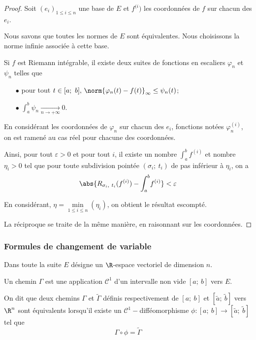 \begin{proof}
Soit $\left(e_i\right)_{1 \leq i \leq n}$ une base de $E$ et $f^{(i})$ les coordonnées de $f$ sur chacun des $e_i$.

Nous savons que toutes les normes de $E$ sont équivalentes. Nous choisissons la norme infinie associée à cette base.

Si $f$ est Riemann intégrable, il existe deux suites de fonctions en escaliers $\varphi_n$ et $\psi_n$ telles que
\begin{itemize}
\item[$\bullet$] pour tout $t \in [a;~b], \, \norm{\varphi_n(t)-f(t)}_{\infty} \leq \psi_n(t)$;
\item[$\bullet$] $\displaystyle{\int_a^b} \psi_n \underset{n \to +\infty}{\longrightarrow} 0$.
\end{itemize}


En considérant les coordonnées de $\varphi_n$ sur chacun des $e_i$, fonctions notées $\varphi_n^{(i)}$, on est ramené au cas réel pour chacune des coordonnées. 

Ainsi, pour tout $\varepsilon>0$ et pour tout $i$, il existe un nombre $\displaystyle{\int_a^b} f^{(i)}$ et nombre $\eta_i>0$ tel que pour toute subdivision pointée $(\sigma_i;~t_i)$ de pas inférieur à $\eta_i$, on a
\[
\abs{R_{\sigma_i,~t_i}(f^{(i)}) - \displaystyle{\int_a^b} f^{(i)}} < \varepsilon
\]

En considérant, $\eta = \min \limits_{1 \leq i \leq n} \left(\eta_i\right)$, on obtient le résultat escompté.

La réciproque se traite de la même manière, en raisonnant sur les coordonnées.
\end{proof}

\subsubsection{Formules de changement de variable}

Dans toute la suite $E$ désigne un $\R$-espace vectoriel de dimension $n$.

\begin{de}
Un chemin $\Gamma$ est une application $\mathcal{C}^1$ d'un intervalle non vide $[a;~b]$ vers $E$.

On dit que deux chemins $\Gamma$ et $\tilde{\Gamma}$ définis respectivement de $[a;~b]$ et $\left [\tilde{a};~\tilde{b}\right ]$ vers $\R^n$ sont équivalents lorsqu'il existe un $\mathcal{C}^1-$difféomorphisme $\phi: [a;~b] \to \left [\tilde{a};~\tilde{b}\right ]$ tel que 
\[
\Gamma \circ \phi = \tilde{\Gamma}
\]
\end{de}


